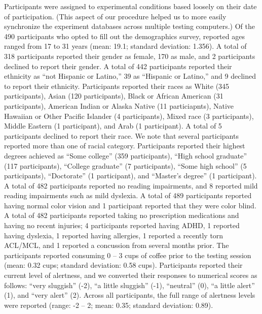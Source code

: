 \documentclass[11pt]{article}
\begin{document}
Participants were assigned to experimental conditions based loosely on their
date of participation. (This aspect of our procedure helped us to more easily
synchronize the experiment databases across multiple testing computers.) Of the
490 participants who opted to fill out the demographics survey, reported ages
ranged from 17 to 31 years (mean: 19.1; standard deviation: 1.356). A total of
318 participants reported their gender as female, 170 as male, and 2
participants declined to report their gender. A total of 442 participants
reported their ethnicity as ``not Hispanic or Latino,'' 39 as ``Hispanic or
Latino,'' and 9 declined to report their ethnicity. Participants reported their
races as White (345 participants), Asian (120 participants), Black or African
American (31 participants), American Indian or Alaska Native (11 particiapnts),
Native Hawaiian or Other Pacific Islander (4 participants), Mixed race (3
participants), Middle Eastern (1 participant), and Arab (1 participant). A
total of 5 participants declined to report their race. We note that several
participants reported more than one of racial category. Participants reported
their highest degrees achieved as ``Some college'' (359 participants), ``High
school graduate'' (117 participants), ``College graduate'' (7 participants),
``Some high school'' (5 participants), ``Doctorate'' (1 participant), and
``Master's degree'' (1 participant). A total of 482 participants reported no
reading impairments, and 8 reported mild reading impairments such as mild
dyslexia. A total of 489 participants reported having normal color vision and 1
participant reported that they were color blind. A total of 482 participants
reported taking no prescription medications and having no recent injuries; 4
participants reported having ADHD, 1 reported having dyslexia, 1 reported
having allergies, 1 reported a recently torn ACL/MCL, and 1 reported a
concussion from several months prior. The participants reported consuming 0 --
3 cups of coffee prior to the testing session (mean: 0.32 cups; standard
deviation: 0.58 cups). Participants reported their current level of alertness,
and we converted their responses to numerical scores as follows: ``very
sluggish'' (-2), ``a little sluggish'' (-1), ``neutral'' (0), ``a little
alert'' (1), and ``very alert'' (2). Across all participants, the full range of
alertness levels were reported (range: -2 -- 2; mean: 0.35; standard deviation:
0.89).
\end{document}
